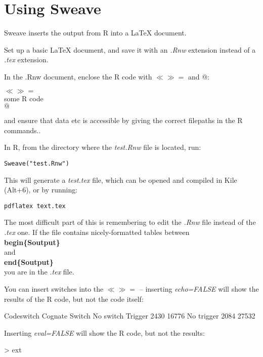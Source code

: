 \documentclass[a4paper,10pt]{article}
\begin{document}
\section{Using Sweave}

Sweave inserts the output from R into a LaTeX document.

Set up a basic LaTeX document, and save it with an \textit{.Rnw} extension instead of a \textit{.tex} extension.

In the .Rnw document, enclose the R code with $\ll\gg=$ and @:

$\ll\gg=$\\
some R code\\
$@$

and ensure that data etc is accessible by giving the correct filepaths in the R commands..

In R, from the directory where the \textit{test.Rnw} file is located, run:

\texttt{Sweave("test.Rnw")}

This will generate a \textit{test.tex} file, which can be opened and compiled in Kile (Alt+6), or by running:

\texttt{pdflatex text.tex}

The most difficult part of this is remembering to edit the \textit{.Rnw} file instead of the \textit{.tex} one.  If the file contains nicely-formatted tables between
\textbf{\\begin\{Soutput\}} \\
and
\textbf{\\end\{Soutput\}} \\
you are in the \textit{.tex} file.


You can insert switches into the $\ll\gg=$ -- inserting \textit{echo=FALSE} will show the results of the R code, but not the code itself:
\begin{Schunk}
\begin{Soutput}
            Codeswitch
Cognate      Switch No switch
  Trigger      2430     16776
  No trigger   2084     27532
\end{Soutput}
\end{Schunk}

Inserting \textit{eval=FALSE} will show the R code, but not the results:
\begin{Schunk}
\begin{Sinput}
> ext
\end{Sinput}
\end{Schunk}
\end{document}
